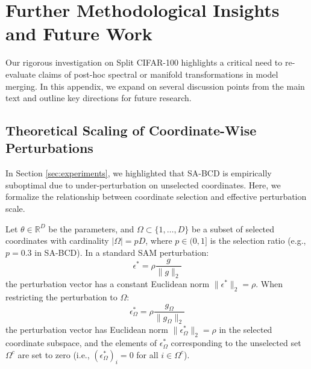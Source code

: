 \documentclass{article}
\theoremstyle{plain}
\theoremstyle{definition}
\theoremstyle{remark}
\begin{document}
\newpage
\appendix
\onecolumn
\section{Further Methodological Insights and Future Work}

Our rigorous investigation on Split CIFAR-100 highlights a critical need to re-evaluate claims of post-hoc spectral or manifold transformations in model merging. In this appendix, we expand on several discussion points from the main text and outline key directions for future research.

\subsection{Theoretical Scaling of Coordinate-Wise Perturbations}
In Section \ref{sec:experiments}, we highlighted that SA-BCD is empirically suboptimal due to under-perturbation on unselected coordinates. Here, we formalize the relationship between coordinate selection and effective perturbation scale.

Let $\theta \in \mathbb{R}^D$ be the parameters, and $\Omega \subset \{1, \dots, D\}$ be a subset of selected coordinates with cardinality $|\Omega| = p D$, where $p \in (0, 1]$ is the selection ratio (e.g., $p = 0.3$ in SA-BCD). In a standard SAM perturbation:
\begin{equation}
  \epsilon^* = \rho \frac{g}{\|g\|_2}
\end{equation}
the perturbation vector has a constant Euclidean norm $\|\epsilon^*\|_2 = \rho$. When restricting the perturbation to $\Omega$:
\begin{equation}
  \epsilon^*_\Omega = \rho \frac{g_\Omega}{\|g_\Omega\|_2}
\end{equation}
the perturbation vector has Euclidean norm $\|\epsilon^*_\Omega\|_2 = \rho$ in the selected coordinate subspace, and the elements of $\epsilon^*_\Omega$ corresponding to the unselected set $\Omega^c$ are set to zero (i.e., $(\epsilon^*_\Omega)_i = 0$ for all $i \in \Omega^c$). 
\end{document}
